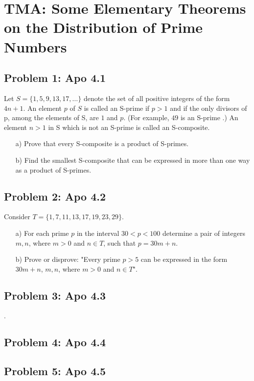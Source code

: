 \section{TMA: Some Elementary Theorems on the Distribution of Prime Numbers}

\subsection[Problem 1]{Problem 1: Apo 4.1}
Let  $S = \{1, 5, 9, 13, 17, \ldots \}$ denote the set of all positive integers of the form $4n + 1$.
An element $p$ of $S$  is called an S-prime if $p > 1$ and if the only divisors of p, among the elements of S,
are $1$ and $p$.  (For example, $49$ is an S-prime .) An element $n > 1$ in S which is not an S-prime is called an
S-composite.
\begin{itemize}
    \item[a)] Prove that every S-composite is a product of S-primes.
    \item[b)] Find the smallest S-composite that can be expressed in  more than one way as a product of S-primes.
\end{itemize}

\subsection[Problem 2]{Problem 2: Apo 4.2}
Consider $T = \{1, 7, 11, 13, 17, 19, 23, 29\}$.
\begin{itemize}
    \item[a)] For each prime $p$ in the interval $30 < p < 100$ determine a pair of integers $m, n$, where $m > 0$
    and $n \in T$, such that $p = 30m +  n$.
    \item[b)] Prove or disprove: "Every prime $p > 5$ can be expressed in the form $30m + n$, $m, n$, where $m > 0$
    and $n \in T$".
\end{itemize}

\subsection[Problem 3]{Problem 3: Apo 4.3}
.

\subsection[Problem 4]{Problem 4: Apo 4.4}

\subsection[Problem 5]{Problem 5: Apo 4.5}

